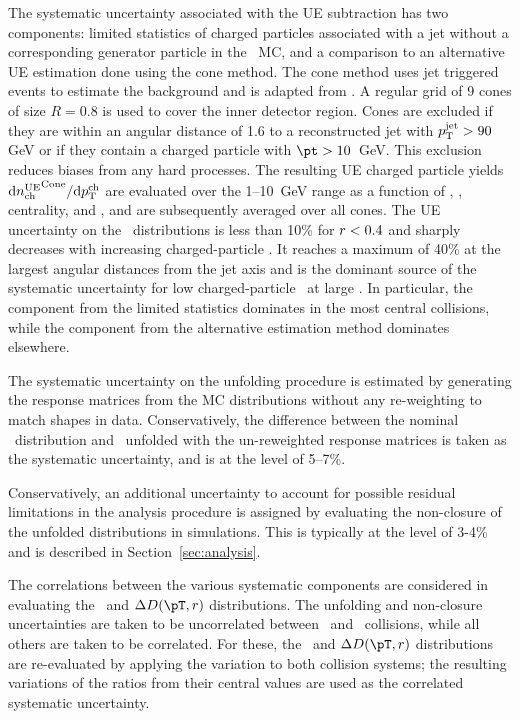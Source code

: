The systematic uncertainty associated with the UE subtraction has two components: limited statistics of charged particles associated with a jet without a corresponding generator particle in the \pbpb\ MC, and a comparison to an alternative UE estimation done using the cone method. The cone method uses jet triggered events to estimate the background and is adapted from \cite{Aaboud:2018hpb, Aaboud:2017bzv}. A regular grid of 9 cones of size $R = 0.8$ is used to cover the inner detector region. Cones are excluded if they are within an angular distance of 1.6 to a reconstructed jet with $\mbox{$p_{\mathrm{T}}^{\mathrm{jet}}$} > 90$ GeV or if they contain a charged particle with \mbox{$\pt > 10$ GeV}. This exclusion reduces biases from any hard processes. The resulting UE charged particle yields $\mathrm{d} \mbox{$n_{\mathrm{ch}}^{\mathrm{UE}}$}^{\mathrm{Cone}}/ \mathrm{d} \mbox{$p_{{\mathrm{T}}}^{\mathrm{ch}}$}$ are evaluated over the \mbox{1--10 GeV} range as a function of \pttrk, \ptjet, centrality, and \rvar, and are subsequently averaged over all cones. The UE uncertainty on the \Dptr\ distributions is less than 10\% for $\mbox{$r$} < 0.4$ and sharply decreases with increasing charged-particle \pT. It  reaches a maximum of 40\% at the largest angular distances from the jet axis and is the dominant source of the systematic uncertainty for low charged-particle \pt\ at large \rvar. In particular, the component from the limited statistics dominates in the most central collisions, while the component from the alternative estimation method dominates elsewhere.


The systematic uncertainty on the unfolding procedure is estimated by generating the response matrices from the MC distributions without any re-weighting to match shapes in data. Conservatively, the difference between the nominal \Dptr\ distribution and \Dptr\ unfolded with the un-reweighted response matrices is taken as the systematic uncertainty, and is at the level of 5--7\%.

Conservatively, an additional uncertainty to account for possible residual limitations in the analysis procedure is assigned by evaluating the non-closure of the unfolded distributions in simulations. This is typically at the level of 3-4\% and is described in Section~\ref{sec:analysis}.

The correlations between the various systematic components are considered in evaluating the \RDptr\ and $\Delta\Dptr$ distributions. The unfolding and non-closure uncertainties are taken to be uncorrelated between \pp\ and \pbpb\ collisions, while all others are taken to be correlated. For these, the \RDptr\ and $\Delta\Dptr$ distributions are re-evaluated by applying the variation to both collision systems; the resulting variations of the ratios from their central values are used as the correlated systematic uncertainty. 

